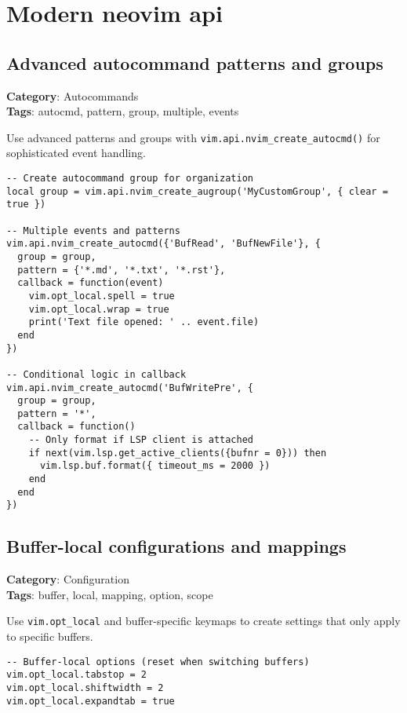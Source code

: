{{{{{{{\chapter{Modern neovim api}
\section{Advanced autocommand patterns and groups}

\textbf{Category}: Autocommands\\ \textbf{Tags}: autocmd, pattern, group, multiple, events
\vspace{0.5cm}

Use advanced patterns and groups with {\footnotesize \Verb§vim.api.nvim_create_autocmd()§} for sophisticated event handling.

\begin{Exa*}{}
\begin{Verbatim}[fontsize=\footnotesize, breaklines, breakanywhere]
-- Create autocommand group for organization
local group = vim.api.nvim_create_augroup('MyCustomGroup', { clear = true })

-- Multiple events and patterns
vim.api.nvim_create_autocmd({'BufRead', 'BufNewFile'}, {
  group = group,
  pattern = {'*.md', '*.txt', '*.rst'},
  callback = function(event)
    vim.opt_local.spell = true
    vim.opt_local.wrap = true
    print('Text file opened: ' .. event.file)
  end
})

-- Conditional logic in callback
vim.api.nvim_create_autocmd('BufWritePre', {
  group = group,
  pattern = '*',
  callback = function()
    -- Only format if LSP client is attached
    if next(vim.lsp.get_active_clients({bufnr = 0})) then
      vim.lsp.buf.format({ timeout_ms = 2000 })
    end
  end
})
\end{Verbatim}
\end{Exa*}

\section{Buffer-local configurations and mappings}

\textbf{Category}: Configuration\\ \textbf{Tags}: buffer, local, mapping, option, scope
\vspace{0.5cm}

Use {\footnotesize \Verb§vim.opt_local§} and buffer-specific keymaps to create settings that only apply to specific buffers.

\begin{Exa*}{}
\begin{Verbatim}[fontsize=\footnotesize, breaklines, breakanywhere]
-- Buffer-local options (reset when switching buffers)
vim.opt_local.tabstop = 2
vim.opt_local.shiftwidth = 2
vim.opt_local.expandtab = true


\end{Verbatim}
\end{Exa*}}}}}}}}
